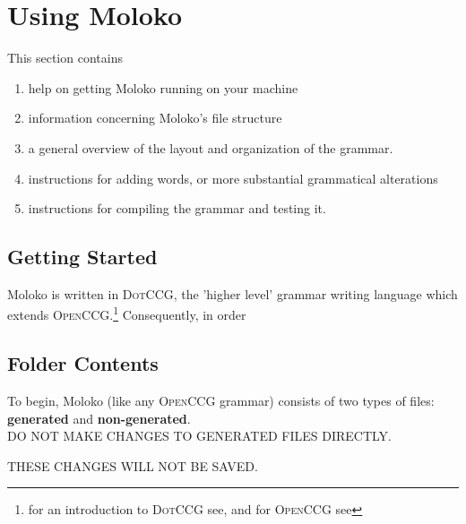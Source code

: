 \section{Using Moloko} \label{sec-Using-Moloko} 

This section contains 
\begin{enumerate}
\item help on getting Moloko running on your machine
\item information concerning Moloko's file structure 
\item a general overview of the layout and organization of the grammar.
\item instructions for adding words, or more substantial grammatical alterations
\item instructions for compiling the grammar and testing it.
\end{enumerate}

\subsection{Getting Started}

Moloko is written in \textsc{DotCCG}, the 'higher level' grammar writing language which extends \textsc{OpenCCG}.\footnote{for an introduction to \textsc{DotCCG} see, and for \textsc{OpenCCG} see} Consequently, in order 

\subsection{Folder Contents}

To begin, Moloko (like any \textsc{OpenCCG} grammar) consists of two types of files: \textbf{generated} and  \textbf{non-generated}. \\ 

DO NOT MAKE CHANGES TO GENERATED FILES DIRECTLY. 

THESE CHANGES WILL NOT BE SAVED. 

